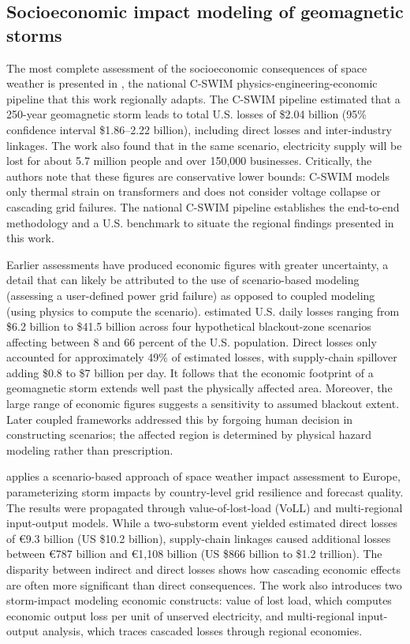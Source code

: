 \documentclass[draft]{agujournal2019}
\begin{document}
\subsection{Socioeconomic impact modeling of geomagnetic storms}

The most complete assessment of the socioeconomic consequences of space weather is presented in , the national C-SWIM physics-engineering-economic pipeline that this work regionally adapts. The C-SWIM pipeline estimated that a 250-year geomagnetic storm leads to total U.S. losses of \$2.04 billion (95\% confidence interval \$1.86--2.22 billion), including direct losses and inter-industry linkages. The work also found that in the same scenario, electricity supply will be lost for about 5.7 million people and over 150,000 businesses. Critically, the authors note that these figures are conservative lower bounds: C-SWIM models only thermal strain on transformers and does not consider voltage collapse or cascading grid failures. The national C-SWIM pipeline establishes the end-to-end methodology and a U.S. benchmark to situate the regional findings presented in this work.

Earlier assessments have produced economic figures with greater uncertainty, a detail that can likely be attributed to the use of scenario-based modeling (assessing a user-defined power grid failure) as opposed to coupled modeling (using physics to compute the scenario).  estimated U.S. daily losses ranging from \$6.2 billion to \$41.5 billion across four hypothetical blackout-zone scenarios affecting between 8 and 66 percent of the U.S. population. Direct losses only accounted for approximately 49\% of estimated losses, with supply-chain spillover adding \$0.8 to \$7 billion per day. It follows that the economic footprint of a geomagnetic storm extends well past the physically affected area. Moreover, the large range of economic figures suggests a sensitivity to assumed blackout extent. Later coupled frameworks addressed this by forgoing human decision in constructing scenarios; the affected region is determined by physical hazard modeling rather than prescription. 

 applies a scenario-based approach of space weather impact assessment to Europe, parameterizing storm impacts by country-level grid resilience and forecast quality. The results were propagated through value-of-lost-load (VoLL) and multi-regional input-output models. While a two-substorm event yielded estimated direct losses of \euro9.3 billion (US \$10.2 billion), supply-chain linkages caused additional losses between \euro787 billion and \euro1,108 billion (US \$866 billion to \$1.2 trillion). The disparity between indirect and direct losses shows how cascading economic effects are often more significant than direct consequences. The work also introduces two storm-impact modeling economic constructs: value of lost load, which computes economic output loss per unit of unserved electricity, and multi-regional input-output analysis, which traces cascaded losses through regional economies. 
\end{document}
